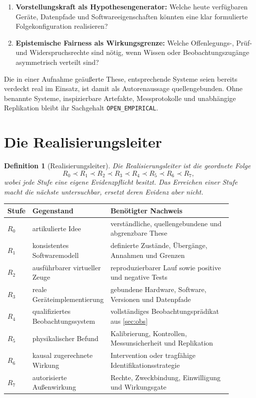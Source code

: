 \documentclass[11pt,a4paper]{article}
\newtheorem{definition}{Definition}[section]
\theoremstyle{remark}
\begin{document}
\begin{enumerate}
  \item \textbf{Vorstellungskraft als Hypothesengenerator:} Welche heute
    verfügbaren Geräte, Datenpfade und Softwareeigenschaften könnten eine
    klar formulierte Folgekonfiguration realisieren?
  \item \textbf{Epistemische Fairness als Wirkungsgrenze:} Welche
    Offenlegungs-, Prüf- und Widerspruchsrechte sind nötig, wenn Wissen oder
    Beobachtungszugänge asymmetrisch verteilt sind?
\end{enumerate}

Die in einer Aufnahme geäußerte These, entsprechende Systeme seien bereits
verdeckt real im Einsatz, ist damit als Autorenaussage quellengebunden. Ohne
benannte Systeme, inspizierbare Artefakte, Messprotokolle und unabhängige
Replikation bleibt ihr Sachgehalt \texttt{OPEN\_EMPIRICAL}.

\section{Die Realisierungsleiter}

\begin{definition}[Realisierungsleiter]
Die Realisierungsleiter ist die geordnete Folge
\[
R_0 \prec R_1 \prec R_2 \prec R_3 \prec R_4 \prec R_5 \prec R_6 \prec R_7,
\]
wobei jede Stufe eine eigene Evidenzpflicht besitzt. Das Erreichen einer
Stufe macht die nächste untersuchbar, ersetzt deren Evidenz aber nicht.
\end{definition}

\begin{longtable}{@{}L{0.08\linewidth}L{0.27\linewidth}L{0.55\linewidth}@{}}
\toprule
\textbf{Stufe} & \textbf{Gegenstand} & \textbf{Benötigter Nachweis} \\
\midrule
\endhead
$R_0$ & artikulierte Idee & verständliche, quellengebundene und abgrenzbare These \\
$R_1$ & konsistentes Softwaremodell & definierte Zustände, Übergänge, Annahmen und Grenzen \\
$R_2$ & ausführbarer virtueller Zeuge & reproduzierbarer Lauf sowie positive und negative Tests \\
$R_3$ & reale Geräteimplementierung & gebundene Hardware, Software, Versionen und Datenpfade \\
$R_4$ & qualifiziertes Beobachtungssystem & vollständiges Beobachtungsprädikat aus \cref{sec:obs} \\
$R_5$ & physikalischer Befund & Kalibrierung, Kontrollen, Messunsicherheit und Replikation \\
$R_6$ & kausal zugerechnete Wirkung & Intervention oder tragfähige Identifikationsstrategie \\
$R_7$ & autorisierte Außenwirkung & Rechte, Zweckbindung, Einwilligung und Wirkungsgate \\
\bottomrule
\end{longtable}
\end{document}
